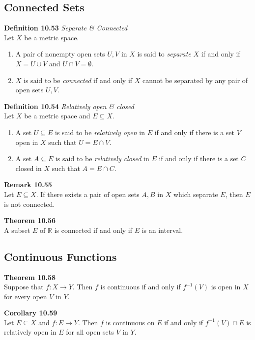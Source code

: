 \documentclass[8pt,landscape]{article}
\begin{document}
\begin{multicols}{3}
\subsection{Connected Sets}

\textbf{Definition 10.53} \emph{Separate \& Connected} \\
Let $X$ be a metric space.
\begin{enumerate}
    \item A pair of nonempty open sets $U, V$ in $X$ is said to \emph{separate} $X$
        if and only if $X = U \cup V$ and $U \cap V = \emptyset$.
    \item $X$ is said to be \emph{connected} if and only if $X$ cannot be separated
        by any pair of open sets $U, V$.
\end{enumerate}


\textbf{Definition 10.54} \emph{Relatively open \& closed} \\
Let $X$ be a metric space and $E \subseteq X$.
\begin{enumerate}
    \item A set $U \subseteq E$ is said to be \emph{relatively open} in $E$
        if and only if there is a set $V$ open in $X$ such that $U = E \cap V$.
    \item A set $A \subseteq E$ is said to be \emph{relatively closed} in $E$
        if and only if there is a set $C$ closed in $X$ such that $A = E \cap C$.
\end{enumerate}


\textbf{Remark 10.55} \\
Let $E \subseteq X$.
If there exists a pair of open sets $A, B$ in $X$ which separate $E$,
then $E$ is not connected.


\textbf{Theorem 10.56} \\
A subset $E$ of $\mathbb{R}$ is connected if and only if $E$ is an interval.

\subsection{Continuous Functions}

\textbf{Theorem 10.58} \\
Suppose that $f : X \to Y$.
Then $f$ is continuous if and only if $f^{-1} (V)$ is open in $X$ for every open
$V$ in $Y$.

\textbf{Corollary 10.59} \\
Let $E \subseteq X$ and $f : E \to Y$.
Then $f$ is continuous on $E$ if and only if $f^{-1}(V) \cap E$ is relatively
open in $E$ for all open sets $V$ in $Y$.


\end{multicols}
\end{document}
